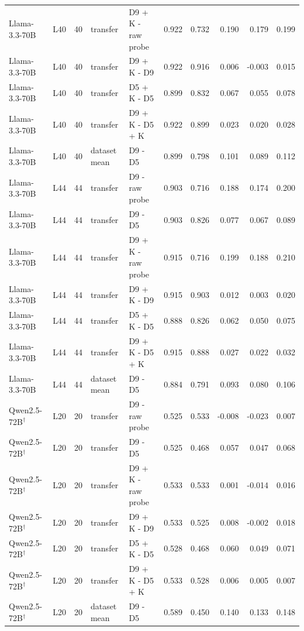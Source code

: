 \begin{table}
{\begin{tabular}{llrllrrrrr}
Llama-3.3-70B & L40 & 40 & transfer & D9 + K - raw probe & 0.922 & 0.732 & 0.190 & 0.179 & 0.199 \\
Llama-3.3-70B & L40 & 40 & transfer & D9 + K - D9 & 0.922 & 0.916 & 0.006 & -0.003 & 0.015 \\
Llama-3.3-70B & L40 & 40 & transfer & D5 + K - D5 & 0.899 & 0.832 & 0.067 & 0.055 & 0.078 \\
Llama-3.3-70B & L40 & 40 & transfer & D9 + K - D5 + K & 0.922 & 0.899 & 0.023 & 0.020 & 0.028 \\
Llama-3.3-70B & L40 & 40 & dataset mean & D9 - D5 & 0.899 & 0.798 & 0.101 & 0.089 & 0.112 \\
Llama-3.3-70B & L44 & 44 & transfer & D9 - raw probe & 0.903 & 0.716 & 0.188 & 0.174 & 0.200 \\
Llama-3.3-70B & L44 & 44 & transfer & D9 - D5 & 0.903 & 0.826 & 0.077 & 0.067 & 0.089 \\
Llama-3.3-70B & L44 & 44 & transfer & D9 + K - raw probe & 0.915 & 0.716 & 0.199 & 0.188 & 0.210 \\
Llama-3.3-70B & L44 & 44 & transfer & D9 + K - D9 & 0.915 & 0.903 & 0.012 & 0.003 & 0.020 \\
Llama-3.3-70B & L44 & 44 & transfer & D5 + K - D5 & 0.888 & 0.826 & 0.062 & 0.050 & 0.075 \\
Llama-3.3-70B & L44 & 44 & transfer & D9 + K - D5 + K & 0.915 & 0.888 & 0.027 & 0.022 & 0.032 \\
Llama-3.3-70B & L44 & 44 & dataset mean & D9 - D5 & 0.884 & 0.791 & 0.093 & 0.080 & 0.106 \\
Qwen2.5-72B$^\dagger$ & L20 & 20 & transfer & D9 - raw probe & 0.525 & 0.533 & -0.008 & -0.023 & 0.007 \\
Qwen2.5-72B$^\dagger$ & L20 & 20 & transfer & D9 - D5 & 0.525 & 0.468 & 0.057 & 0.047 & 0.068 \\
Qwen2.5-72B$^\dagger$ & L20 & 20 & transfer & D9 + K - raw probe & 0.533 & 0.533 & 0.001 & -0.014 & 0.016 \\
Qwen2.5-72B$^\dagger$ & L20 & 20 & transfer & D9 + K - D9 & 0.533 & 0.525 & 0.008 & -0.002 & 0.018 \\
Qwen2.5-72B$^\dagger$ & L20 & 20 & transfer & D5 + K - D5 & 0.528 & 0.468 & 0.060 & 0.049 & 0.071 \\
Qwen2.5-72B$^\dagger$ & L20 & 20 & transfer & D9 + K - D5 + K & 0.533 & 0.528 & 0.006 & 0.005 & 0.007 \\
Qwen2.5-72B$^\dagger$ & L20 & 20 & dataset mean & D9 - D5 & 0.589 & 0.450 & 0.140 & 0.133 & 0.148 \\

\end{tabular}}
\end{table}
